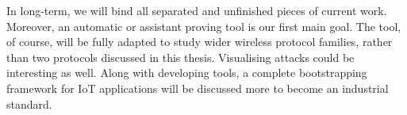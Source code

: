 In long-term, we will bind all separated and unfinished pieces of current work. Moreover, an automatic or assistant proving tool is our first main goal. The tool, of course, will be fully adapted to study wider wireless protocol families, rather than two protocols discussed in this thesis. Visualising attacks could be interesting as well. Along with developing tools, a complete bootstrapping framework for IoT applications will be discussed more to become an industrial standard. 
